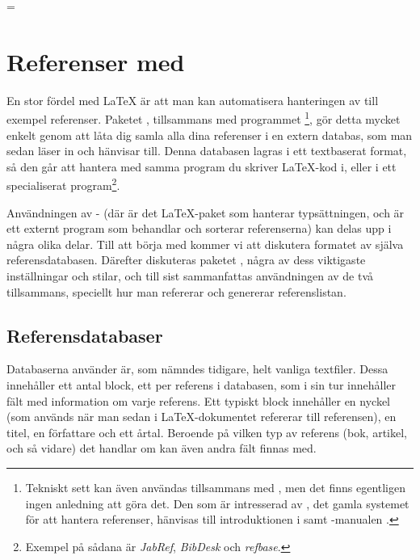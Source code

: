 \documentclass[lang=sv,ptsize=10pt,font=none,nomath,titles=bf,../../a4.tex]{subfiles}
\begin{document}
\chardef\previousmode=\interactionmode
\nonstopmode
%
\section{Referenser med }\label{sec:5}
En stor fördel med \LaTeX{} är att man kan automatisera hanteringen av
till exempel referenser. Paketet , tillsammans med
programmet \footnote{Tekniskt sett kan även
\BibTeX{} användas tillsammans med , men det finns egentligen ingen anledning att göra det. Den som är intresserad av
\BibTeX{}, det gamla systemet för att hantera referenser, hänvisas till introduktionen i \textcite{Fenn06} samt \BibTeX{}-manualen
\parencite{Patashnik88a}.}, gör detta mycket enkelt genom att låta dig
samla alla dina referenser i en extern databas, som man sedan läser in
och hänvisar till. Denna databasen lagras i ett textbaserat format, så
den går att hantera med samma program du skriver \LaTeX-kod i, eller i
ett specialiserat program\footnote{Exempel på sådana är \emph{JabRef},
\emph{BibDesk} och \emph{refbase}.}.

Användningen av - (där  är det
\LaTeX-paket som hanterar typsättningen, och  är ett externt
program som behandlar och sorterar referenserna) kan delas upp i några
olika delar. Till att börja med kommer vi att diskutera formatet av
själva referensdatabasen. Därefter diskuteras paketet ,
några av dess viktigaste inställningar och stilar, och till sist
sammanfattas användningen av de två tillsammans, speciellt hur man
refererar och genererar referenslistan.

\subsection{Referensdatabaser}
Databaserna  använder är, som nämndes tidigare, helt
vanliga textfiler. Dessa innehåller ett antal block, ett per referens
i databasen, som i sin tur innehåller fält med information om varje
referens. Ett typiskt block innehåller en nyckel (som används när man
sedan i \LaTeX-dokumentet refererar till referensen), en titel, en
författare och ett årtal. Beroende på vilken typ av referens (bok,
artikel, och så vidare) det handlar om kan även andra fält finnas med.
\end{document}
